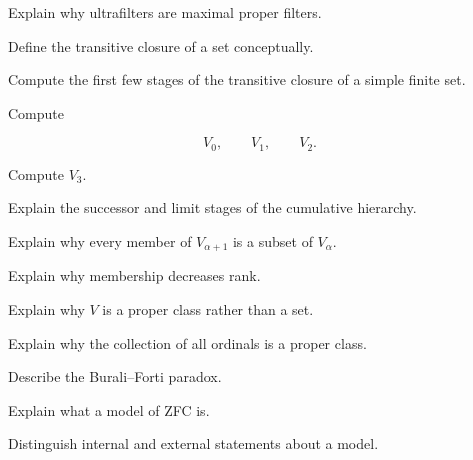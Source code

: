 \begin{exercise}[3]
Explain why ultrafilters are maximal proper filters.
\end{exercise}

\begin{exercise}[2]
Define the transitive closure of a set conceptually.
\end{exercise}

\begin{exercise}[3]
Compute the first few stages of the transitive closure of a simple finite
set.
\end{exercise}

\begin{exercise}[2]
Compute

\[
V_0,
\qquad
V_1,
\qquad
V_2.
\]
\end{exercise}

\begin{exercise}[3]
Compute \(V_3\).
\end{exercise}

\begin{exercise}[3]
Explain the successor and limit stages of the cumulative hierarchy.
\end{exercise}

\begin{exercise}[3]
Explain why every member of \(V_{\alpha+1}\) is a subset of \(V_\alpha\).
\end{exercise}

\begin{exercise}[3]
Explain why membership decreases rank.
\end{exercise}

\begin{exercise}[3]
Explain why \(V\) is a proper class rather than a set.
\end{exercise}

\begin{exercise}[3]
Explain why the collection of all ordinals is a proper class.
\end{exercise}

\begin{exercise}[3]
Describe the Burali--Forti paradox.
\end{exercise}

\begin{exercise}[3]
Explain what a model of ZFC is.
\end{exercise}

\begin{exercise}[3]
Distinguish internal and external statements about a model.
\end{exercise}

